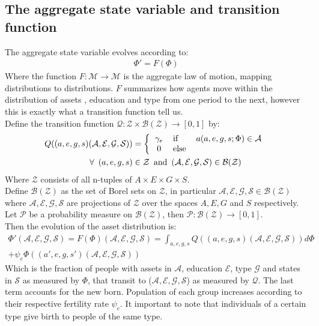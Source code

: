  \subsection*{The aggregate state variable and transition function}
\noindent The aggregate state variable evolves according to:
\begin{align}
\Phi'=F(\Phi)
\end{align} 
Where the function $F:\mathcal{M}\to\mathcal{M}$ is the aggregate law of motion, mapping distributions to distributions. $F$ summarizes how agents move within the distribution of assets , education and type from one period to the next, however this is exactly what a transition function tell us. \\
\noindent Define the transition function $\mathcal{Q}:\mathcal{Z}\times\mathcal{B(Z)}\to[0,1]$ by: 
\begin{align*}
Q((a,e,g,s)(\mathcal{A},\mathcal{E},\mathcal{G},\mathcal{S})) &= \left\{
\begin{tabular}{clc}
$\gamma_{e}$ & if      & $a(a,e,g,s;\Phi) \in \mathcal{A} $\\
0 & else & 
\end{tabular}
\right.\\
\forall \,\,\,(a,e,g,s)&\in\mathcal{Z}\,\,\,\mbox{and}\,\,\,(\mathcal{A,E,G,S})\in{\mathcal{B(Z)}}
\end{align*}
Where $\mathcal{Z}$ consists of all n-tuples of $A\times E\times G\times S$. \\
Define $\mathcal{B(Z)}$ as the set of Borel sets on $\mathcal{Z}$, in particular $\mathcal{A,E,G,S}\in\mathcal{B(Z)}$ where $\mathcal{A,E,G,S}$ are projections of $\mathcal{Z}$ over the spaces $A,E,G$ and $S$ respectively. Let $\mathcal{P}$ be a probability measure on $\mathcal{B(Z)}$, then $\mathcal{P}: \mathcal{B(Z)}\to[0,1]$.\\
Then the evolution of the asset distribution is:
\begin{align}
\Phi'(\mathcal{A,E,G,S}) = F(\Phi) (\mathcal{A,E,G,S})= \int_{a,e,g,s} Q((a,e,g,s)(\mathcal{A,E,G,S})) d \Phi\\+\psi_{e}\Phi((a',e,g,s')(\mathcal{A,E,G,S}))
\end{align}
Which is the fraction of people with assets in $\mathcal{A}$, education $\mathcal{E}$, type $\mathcal{G}$ and states in $\mathcal{S}$ as measured by $\Phi$, that transit to ($\mathcal{A,E,G,S}$) as measured by $\mathcal{Q}$. The last term accounts for the new born. Population of each group increases according to their respective fertility rate $\psi_{e}$. It important to note that individuals of a certain type give birth to people of the same type.
